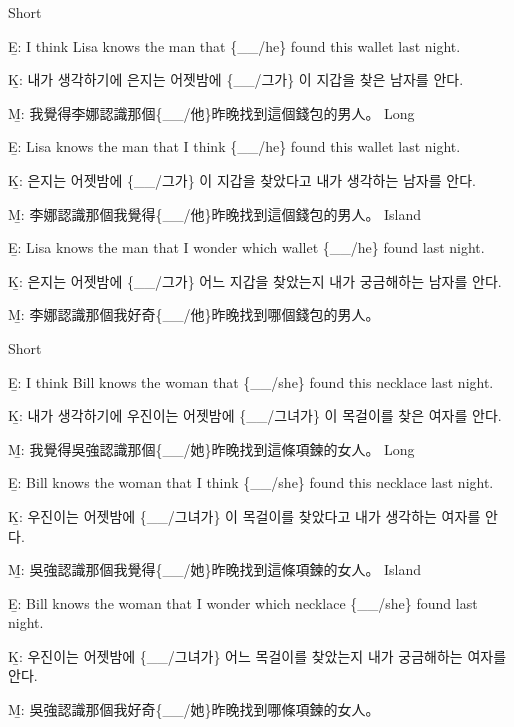 \pex %
\a Short\par\nobreak
\beginsubsub
\b{E:} I think Lisa knows the man that \{\_\_/he\} found this wallet last night.\par\nobreak
\b{K:} \ko 내가 생각하기에 은지는 어젯밤에 \{\_\_/그가\} 이 지갑을 찾은 남자를 안다. \normalfont\par\nobreak
\b{M:} \zh 我覺得李娜認識那個\{\_\_/他\}昨晚找到這個錢包的男人。 \normalfont
\endsubsub
\a Long\par\nobreak
\beginsubsub
\b{E:} Lisa knows the man that I think \{\_\_/he\} found this wallet last night.\par\nobreak
\b{K:} \ko 은지는 어젯밤에 \{\_\_/그가\} 이 지갑을 찾았다고 내가 생각하는 남자를 안다. \normalfont\par\nobreak
\b{M:} \zh 李娜認識那個我覺得\{\_\_/他\}昨晚找到這個錢包的男人。 \normalfont
\endsubsub
\a Island\par\nobreak
\beginsubsub
\b{E:} Lisa knows the man that I wonder which wallet \{\_\_/he\} found last night.\par\nobreak
\b{K:} \ko 은지는 어젯밤에 \{\_\_/그가\} 어느 지갑을 찾았는지 내가 궁금해하는 남자를 안다\normalfont.\par\nobreak
\b{M:} \zh 李娜認識那個我好奇\{\_\_/他\}昨晚找到哪個錢包的男人。\normalfont
\endsubsub
\xe

\pex %
\a Short\par\nobreak
\beginsubsub
\b{E:} I think Bill knows the woman that \{\_\_/she\} found this necklace last night.\par\nobreak
\b{K:} \ko 내가 생각하기에 우진이는 어젯밤에 \{\_\_/그녀가\} 이 목걸이를 찾은 여자를 안다. \normalfont\par\nobreak
\b{M:} \zh 我覺得吳強認識那個\{\_\_/她\}昨晚找到這條項鍊的女人。 \normalfont
\endsubsub
\a Long\par\nobreak
\beginsubsub
\b{E:} Bill knows the woman that I think \{\_\_/she\} found this necklace last night.\par\nobreak
\b{K:} \ko 우진이는 어젯밤에 \{\_\_/그녀가\} 이 목걸이를 찾았다고 내가 생각하는 여자를 안다. \normalfont\par\nobreak
\b{M:} \zh 吳強認識那個我覺得\{\_\_/她\}昨晚找到這條項鍊的女人。 \normalfont
\endsubsub
\a Island\par\nobreak
\beginsubsub
\b{E:} Bill knows the woman that I wonder which necklace \{\_\_/she\} found last night.\par\nobreak
\b{K:} \ko 우진이는 어젯밤에 \{\_\_/그녀가\} 어느 목걸이를 찾았는지 내가 궁금해하는 여자를 안다\normalfont.\par\nobreak
\b{M:} \zh 吳強認識那個我好奇\{\_\_/她\}昨晚找到哪條項鍊的女人。\normalfont
\endsubsub
\xe

